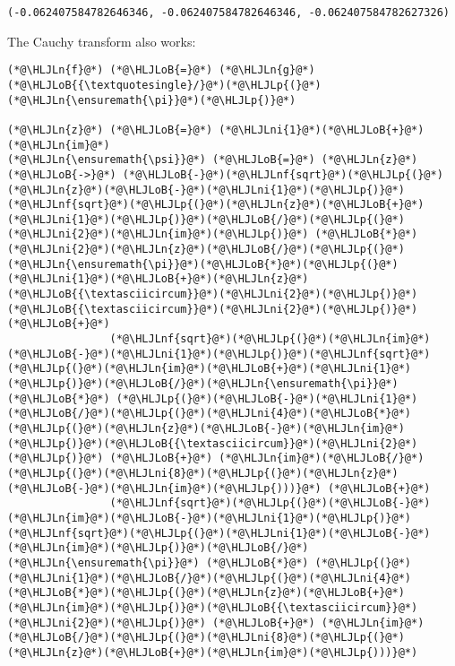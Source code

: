 \documentclass[12pt,landscape]{article}
\newcommand{\HLJLn}[1]{#1}
\newcommand{\HLJLnf}[1]{\textcolor[RGB]{66,102,213}{#1}}
\newcommand{\HLJLni}[1]{\textcolor[RGB]{59,151,46}{#1}}
\newcommand{\HLJLoB}[1]{\textcolor[RGB]{102,102,102}{\textbf{#1}}}
\newcommand{\HLJLp}[1]{#1}
\begin{document}
{\begin{lstlisting}
(-0.062407584782646346, -0.062407584782646346, -0.062407584782627326)
\end{lstlisting}


The Cauchy transform also works:


\begin{lstlisting}
(*@\HLJLn{f}@*) (*@\HLJLoB{=}@*) (*@\HLJLn{g}@*)(*@\HLJLoB{{\textquotesingle}/}@*)(*@\HLJLp{(}@*)(*@\HLJLn{\ensuremath{\pi}}@*)(*@\HLJLp{)}@*)

(*@\HLJLn{z}@*) (*@\HLJLoB{=}@*) (*@\HLJLni{1}@*)(*@\HLJLoB{+}@*)(*@\HLJLn{im}@*)
(*@\HLJLn{\ensuremath{\psi}}@*) (*@\HLJLoB{=}@*) (*@\HLJLn{z}@*) (*@\HLJLoB{->}@*) (*@\HLJLoB{-}@*)(*@\HLJLnf{sqrt}@*)(*@\HLJLp{(}@*)(*@\HLJLn{z}@*)(*@\HLJLoB{-}@*)(*@\HLJLni{1}@*)(*@\HLJLp{)}@*)(*@\HLJLnf{sqrt}@*)(*@\HLJLp{(}@*)(*@\HLJLn{z}@*)(*@\HLJLoB{+}@*)(*@\HLJLni{1}@*)(*@\HLJLp{)}@*)(*@\HLJLoB{/}@*)(*@\HLJLp{(}@*)(*@\HLJLni{2}@*)(*@\HLJLn{im}@*)(*@\HLJLp{)}@*) (*@\HLJLoB{*}@*) (*@\HLJLni{2}@*)(*@\HLJLn{z}@*)(*@\HLJLoB{/}@*)(*@\HLJLp{(}@*)(*@\HLJLn{\ensuremath{\pi}}@*)(*@\HLJLoB{*}@*)(*@\HLJLp{(}@*)(*@\HLJLni{1}@*)(*@\HLJLoB{+}@*)(*@\HLJLn{z}@*)(*@\HLJLoB{{\textasciicircum}}@*)(*@\HLJLni{2}@*)(*@\HLJLp{)}@*)(*@\HLJLoB{{\textasciicircum}}@*)(*@\HLJLni{2}@*)(*@\HLJLp{)}@*) (*@\HLJLoB{+}@*)
                (*@\HLJLnf{sqrt}@*)(*@\HLJLp{(}@*)(*@\HLJLn{im}@*)(*@\HLJLoB{-}@*)(*@\HLJLni{1}@*)(*@\HLJLp{)}@*)(*@\HLJLnf{sqrt}@*)(*@\HLJLp{(}@*)(*@\HLJLn{im}@*)(*@\HLJLoB{+}@*)(*@\HLJLni{1}@*)(*@\HLJLp{)}@*)(*@\HLJLoB{/}@*)(*@\HLJLn{\ensuremath{\pi}}@*) (*@\HLJLoB{*}@*) (*@\HLJLp{(}@*)(*@\HLJLoB{-}@*)(*@\HLJLni{1}@*)(*@\HLJLoB{/}@*)(*@\HLJLp{(}@*)(*@\HLJLni{4}@*)(*@\HLJLoB{*}@*)(*@\HLJLp{(}@*)(*@\HLJLn{z}@*)(*@\HLJLoB{-}@*)(*@\HLJLn{im}@*)(*@\HLJLp{)}@*)(*@\HLJLoB{{\textasciicircum}}@*)(*@\HLJLni{2}@*)(*@\HLJLp{)}@*) (*@\HLJLoB{+}@*) (*@\HLJLn{im}@*)(*@\HLJLoB{/}@*)(*@\HLJLp{(}@*)(*@\HLJLni{8}@*)(*@\HLJLp{(}@*)(*@\HLJLn{z}@*)(*@\HLJLoB{-}@*)(*@\HLJLn{im}@*)(*@\HLJLp{)))}@*) (*@\HLJLoB{+}@*)
                (*@\HLJLnf{sqrt}@*)(*@\HLJLp{(}@*)(*@\HLJLoB{-}@*)(*@\HLJLn{im}@*)(*@\HLJLoB{-}@*)(*@\HLJLni{1}@*)(*@\HLJLp{)}@*)(*@\HLJLnf{sqrt}@*)(*@\HLJLp{(}@*)(*@\HLJLni{1}@*)(*@\HLJLoB{-}@*)(*@\HLJLn{im}@*)(*@\HLJLp{)}@*)(*@\HLJLoB{/}@*)(*@\HLJLn{\ensuremath{\pi}}@*) (*@\HLJLoB{*}@*) (*@\HLJLp{(}@*)(*@\HLJLni{1}@*)(*@\HLJLoB{/}@*)(*@\HLJLp{(}@*)(*@\HLJLni{4}@*)(*@\HLJLoB{*}@*)(*@\HLJLp{(}@*)(*@\HLJLn{z}@*)(*@\HLJLoB{+}@*)(*@\HLJLn{im}@*)(*@\HLJLp{)}@*)(*@\HLJLoB{{\textasciicircum}}@*)(*@\HLJLni{2}@*)(*@\HLJLp{)}@*) (*@\HLJLoB{+}@*) (*@\HLJLn{im}@*)(*@\HLJLoB{/}@*)(*@\HLJLp{(}@*)(*@\HLJLni{8}@*)(*@\HLJLp{(}@*)(*@\HLJLn{z}@*)(*@\HLJLoB{+}@*)(*@\HLJLn{im}@*)(*@\HLJLp{)))}@*)


\end{lstlisting}}
\end{document}
